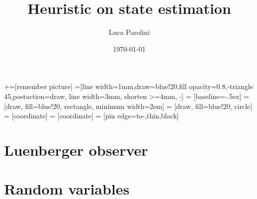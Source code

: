 \documentclass[aspectratio=169, fleqn, 10pt]{beamer}
\title{Heuristic on state estimation}
\author{Luca Parolini}
\date{\today}
\begin{document}
	
+=[remember picture]
=[line width=1mm,draw=blue!20,fill opacity=0.8,-triangle 45,postaction={draw, line width=3mm, shorten >=4mm, -}]
 = [baseline=-.5ex]
 = [draw, fill=blue!20, rectangle, minimum width=2em] %
 = [draw, fill=blue!20, circle] %
 = [coordinate]
 = [coordinate]
 = [pin edge={to-,thin,black}]

\everymath{\displaystyle}

\maketitle
\frame{\tableofcontents}
\section{Luenberger observer}

\section{Random variables}

\end{document}
